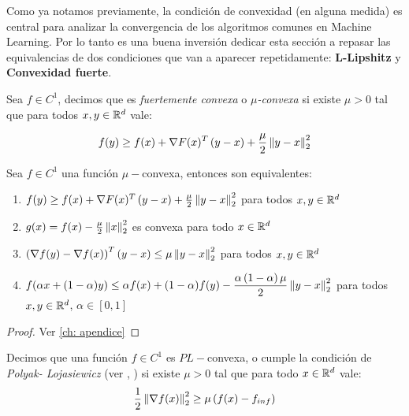 Como ya notamos previamente, la condici\'on de convexidad (en alguna medida) es central para analizar la convergencia de los algoritmos comunes en Machine Learning. Por lo tanto es una buena inversi\'on dedicar esta secci\'on a repasar las equivalencias de dos condiciones que van a aparecer repetidamente: \textbf{L-Lipshitz} y \textbf{Convexidad fuerte}.

\begin{definition}
	\label{def: Fuertemente convexa}
	Sea $f \in C^1$, decimos que es \textit{fuertemente convexa} o $\mu$\textit{-convexa} si existe $\mu > 0$ tal que para todos $x,y \in {\mathbb{R}}^d$ vale:
	
	\begin{equation}
		f(y) \geq f(x) + \nabla F(x)^T\left(y-x\right) + \frac{\mu}{2} \left\lVert y-x\right\rVert_2^2
	\end{equation}
\end{definition}

\begin{proposition}
	\label{prop: equivalencias convexidad fuerte}
	Sea $f \in C^1$ una funci\'on $\mu-$convexa, entonces son equivalentes:
	\begin{enumerate}
		\item $f(y) \geq f(x) + \nabla F(x)^T\left(y-x\right) + \frac{\mu}{2} \left\lVert y-x\right\rVert_2^2$ para todos $x,y \in {\mathbb{R}}^d$
		\item $g(x) = f(x) - \frac{\mu}{2} \left\lVert x\right\rVert_2^2$ es convexa para todo $x \in {\mathbb{R}}^d$
		\item $\left(\nabla f(y) - \nabla f(x)\right)^T \left(y-x\right) \leq \mu \left\lVert y-x\right\rVert_2^2$ para todos $x,y \in {\mathbb{R}}^d$
		\item $f(\alpha x + (1-\alpha)y) \leq \alpha f(x) + (1-\alpha) f(y) - \dfrac{\alpha \left(1 - \alpha \right) \mu}{2}\left\lVert y-x\right\rVert_2^2$ para  todos $x,y \in {\mathbb{R}}^d$, $\alpha \in [0,1]$
	\end{enumerate}
\end{proposition}

\begin{proof}
	Ver \ref{ch: apendice}
\end{proof}

\begin{definition}
	\label{def: Condicion PL}
	Decimos que una funci\'on $f \in C^1$ es $PL-$convexa, o cumple la condici\'on de \textit{Polyak- Lojasiewicz} (ver \cite{polyak:1963}, \cite{lojasiewicz:1963}) si existe $\mu >0$ tal que para todo $x \in {\mathbb{R}}^d$ vale:
	\begin{equation}
	\frac{1}{2} \left\lVert\nabla f(x)\right\rVert^2_2 \geq \mu \left(f(x) - f_{inf}\right)
	\end{equation}
\end{definition}

